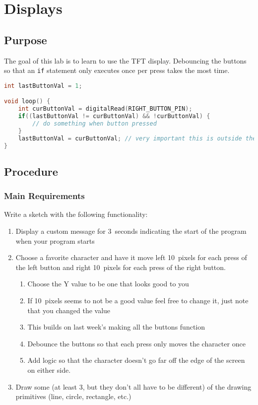 \chapter{Displays}

\section{Purpose}
The goal of this lab is to learn to use the TFT display. Debouncing the buttons 
so that an \lstinline|if| statement only executes once per press takes the most time.

\begin{lstlisting}[language=C++, caption={This is example code for debouncing a button.},label={lst:debounceEx}]
int lastButtonVal = 1;

void loop() {
    int curButtonVal = digitalRead(RIGHT_BUTTON_PIN);
    if((lastButtonVal != curButtonVal) && !curButtonVal) {
        // do something when button pressed
    }
    lastButtonVal = curButtonVal; // very important this is outside the if and inside loop()
}
\end{lstlisting}

\section{Procedure}
\subsection{Main Requirements}
Write a sketch with the following functionality:
\begin{enumerate}
    \item Display a custom message for 3~seconds indicating the start of the program when
            your program starts 
    \item Choose a favorite character and have it move left 10~pixels for each press
            of the left button and right 10~pixels for each press of the right button.
    \begin{enumerate}
        \item Choose the Y value to be one that looks good to you
        \item If 10~pixels seems to not be a good value feel free to change it, just note
                that you changed the value
        \item This builds on last week's making all the buttons function
        \item Debounce the buttons so that each press only moves the character once
        \item Add logic so that the character doesn't go far off the edge of the screen
                on either side.
    \end{enumerate}
    \item Draw some (at least 3, but they don't all have to be different) of the 
            drawing primitives (line, circle, rectangle, etc.)
\end{enumerate}


